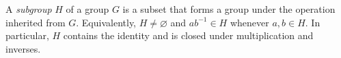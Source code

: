 
A \emph{subgroup} $H$ of a group $G$ is a subset that forms a group under the operation inherited from $G$. Equivalently, $H\ne\varnothing$ and $ab^{-1}\in H$ whenever $a,b\in H$. In particular, $H$ contains the identity and is closed under multiplication and inverses.
